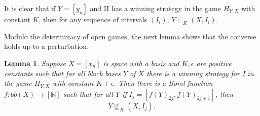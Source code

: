 \documentclass[10pt]{amsart}
\numberwithin{equation}{section}
\newtheorem{lemme}[thm]{Lemma}
\begin{document}
It is clear that if $Y=[y_n]$ and II has a winning strategy in the game
$H_{Y,X}$ with constant $K$, then for any sequence of intervals $(I_i)$,
$Y \sqsubseteq_K(X,I_i)$.

Modulo the determinacy of open games, the next lemma shows that the converse holds up to a perturbation.
\begin{lemme}\label{strategic uniformisation}
Suppose $X=[x_n]$ is space with a basis and $K, \epsilon$  are positive
constants such that for all block bases $Y$ of $X$ there is a winning strategy
for I in the game $H_{Y,X}$ with constant $K+\epsilon$. Then there is a Borel
function $f\colon bb(X){\rightarrow} [{\mathbb N}]$ such that for all $Y$ if
$I_j=[f(Y)_{2j},f(Y)_{2j+1}]$, then
$$
Y\not\sqsubseteq_K(X,I_j).
$$
\end{lemme}
\end{document}
